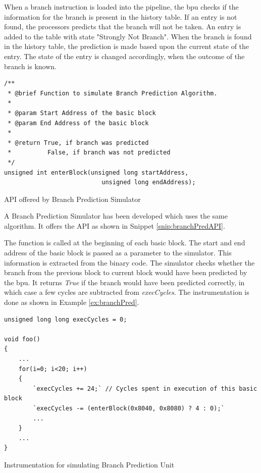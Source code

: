 When a branch instruction is loaded into the pipeline, the \gls{bpu} checks if the information for the branch is present in the history table. If an entry is not found, the processors predicts that the branch will not be taken. An entry is added to the table with state "Strongly Not Branch". When the branch is found in the history table, the prediction is made based upon the current state of the entry. The state of the entry is changed accordingly, when the outcome of the branch is known.

\begin{Snippet}[h!]
\begin{lstlisting}
/**
 * @brief Function to simulate Branch Prediction Algorithm.
 *
 * @param Start Address of the basic block
 * @param End Address of the basic block
 *
 * @return True, if branch was predicted
 *          False, if branch was not predicted
 */
unsigned int enterBlock(unsigned long startAddress,
                           unsigned long endAddress);
\end{lstlisting}
\caption{API offered by Branch Prediction Simulator}
\label{snip:branchPredAPI}
\end{Snippet}

A Branch Prediction Simulator has been developed which uses the same algorithm. It offers the API as shown in Snippet \ref{snip:branchPredAPI}. 

The function is called at the beginning of each basic block. The start and end address of the basic block is passed as a parameter to the simulator. This information is extracted from the binary code. The simulator checks whether the branch from the previous block to current block would have been predicted by the \gls{bpu}. It returns \emph{True} if the branch would have been predicted correctly, in which case a few cycles are subtracted from \emph{execCycles}. The instrumentation is done as shown in Example \ref{ex:branchPred}.

\begin{Example}[h!]
\begin{lstlisting}
unsigned long long execCycles = 0;

void foo()
{
    ...
    for(i=0; i<20; i++)
    {
        `execCycles += 24;` // Cycles spent in execution of this basic block
        `execCycles -= (enterBlock(0x8040, 0x8080) ? 4 : 0);`
        ...
    }
    ...
}
\end{lstlisting}
\caption{Instrumentation for simulating Branch Prediction Unit}
\label{ex:branchPred}
\end{Example}

